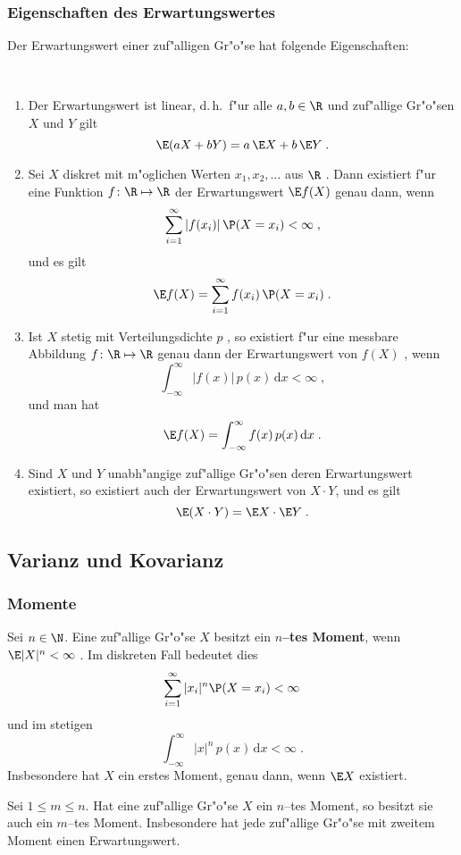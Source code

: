 \subsubsection{Eigenschaften des Erwartungswertes}
Der Erwartungswert einer zuf"alligen Gr"o"se hat folgende Eigenschaften$\colon$
\begin{thm}~
\begin{enumerate}
\item
Der Erwartungswert ist linear, d.\,h.~f"ur alle $a,b\in\R$ und zuf"allige Gr"o"sen $X$ und $Y$
gilt
$$
\E(a X+ b Y) = a\,\E X + b\, \E Y\;.
$$
\item
Sei  $X$ diskret mit m"oglichen Werten $x_1,x_2,\ldots$ aus $\R$ .
Dann existiert f"ur eine Funktion $f \colon\R\mapsto\R$
der Erwartungswert $\E f(X)$ genau dann, wenn
$$
\sum_{i=1}^\infty |f(x_i)|\,\P(X=x_i)<\infty\;,
$$
und es gilt
$$
\E f(X)=\sum_{i=1}^\infty f(x_i)\,\P(X=x_i)\;.
$$
\item
Ist $X$ stetig mit Verteilungsdichte $p$ , so existiert f"ur eine messbare
Abbildung $f \colon\R\mapsto\R$ genau dann der Erwartungswert von $f(X)$ , wenn
$$
\int_{-\infty}^\infty |f(x)|\,p(x)\,\mathrm d x<\infty\;,
$$
und man hat
$$
\E f(X)=\int_{-\infty}^\infty  f(x) \,p(x)\,\mathrm d x\;.
$$
\item
Sind $X$ und $Y$ unabh"angige zuf"allige Gr"o"sen deren Erwartungswert existiert,
so existiert auch der Erwartungswert von $X\cdot Y$, und es gilt
$$
\E(X\cdot Y)= \E X \cdot \E Y\;.
$$
\end{enumerate}
\end{thm}

\subsection{Varianz und Kovarianz}
\subsubsection{Momente}
Sei $n\in\N$. Eine zuf"allige Gr"o"se $X$ besitzt ein \textbf{$n$--tes Moment}, wenn
$\E|X|^n<\infty$ . Im diskreten Fall bedeutet dies
$$
\sum_{i=1}^\infty |x_i|^n\P(X=x_i)<\infty
$$
und im stetigen
$$
\int_{-\infty}^\infty |x|^n\,p(x)\,\mathrm d x<\infty\;.
$$
Insbesondere hat $X$ ein erstes Moment, genau dann, wenn $\E X$ existiert.
\begin{thm}
Sei $1\le m\le n$. Hat eine zuf"allige Gr"o"se $X$ ein $n$--tes Moment, so besitzt sie auch ein $m$--tes Moment.
Insbesondere hat jede zuf"allige Gr"o"se mit zweitem Moment einen Erwartungswert.
\end{thm}

